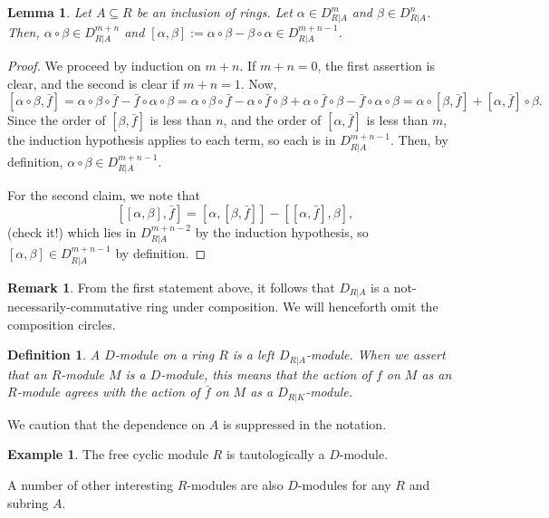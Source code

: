 \documentclass[11pt]{book}
\newtheorem{lemma}[theorem]{Lemma}
\newtheorem{definition}[theorem]{Definition}
\numberwithin{equation}{section}
\numberwithin{theorem}{chapter}
\theoremstyle{definition}
\newtheorem{example}[theorem]{Example}
\newtheorem*{basic properties}{Basic Properties}
\newtheorem*{Important Remark}{Important Remark}
\newtheorem{remark}[theorem]{Remark}
\theoremstyle{remark}
\begin{document}
\begin{lemma}
	Let $A\subseteq R$ be an inclusion of rings. Let $\alpha\in D^m_{R|A}$ and $\beta\in D^n_{R|A}$. Then, $\alpha \circ \beta \in D^{m+n}_{R|A}$ and $[\alpha,\beta]:=\alpha \circ \beta - \beta \circ \alpha \in D^{m+n-1}_{R|A}$.\index{$[\alpha,\beta]$}
\end{lemma}
\begin{proof}
We proceed by induction on $m+n$. If $m+n=0$, the first assertion is clear, and the second is clear if $m+n=1$. Now, 
\[ [\alpha \circ \beta, \bar{f}]=\alpha \circ \beta \circ \bar{f} - \bar{f} \circ \alpha \circ \beta  = \alpha \circ \beta \circ \bar{f} - \alpha  \circ \bar{f} \circ \beta + \alpha  \circ \bar{f} \circ \beta - \bar{f} \circ \alpha \circ \beta = \alpha \circ [ \beta, \bar{f}] + [\alpha ,\bar{f}] \circ \beta.\]
Since the order of $ [ \beta, \bar{f}]$ is less than $n$, and the order of $[\alpha ,\bar{f}]$ is less than $m$, the induction hypothesis applies to each term, so each is in $D^{m+n-1}_{R|A}$. Then, by definition, $\alpha \circ \beta\in D^{m+n-1}_{R|A}$.

For the second claim, we note that 
\[ [[\alpha,\beta],\bar{f}] = [\alpha, [\beta,\bar{f}]] - [[\alpha,\bar{f}],\beta],  \]
(check it!) which lies in $D^{m+n-2}_{R|A}$ by the induction hypothesis, so $[\alpha,\beta]\in D^{m+n-1}_{R|A}$ by definition.
\end{proof}

\begin{remark} From the first statement above, it follows that $D_{R|A}$ is a not-necessarily-commutative ring under composition. We will henceforth omit the composition circles.
\end{remark}

\begin{definition} A \emph{$D$-module} on a ring $R$ is a left $D_{R|A}$-module. When we assert that an $R$-module $M$ is a $D$-module, this means that the action of $f$ on $M$ as an $R$-module agrees with the action of $\bar{f}$ on $M$ as a $D_{R|K}$-module.
\end{definition}

We caution that the dependence on $A$ is suppressed in the notation.

\begin{example}
	The free cyclic module $R$ is tautologically a $D$-module.
\end{example}

A number of other interesting $R$-modules are also $D$-modules for any $R$ and subring $A$.
\end{document}
